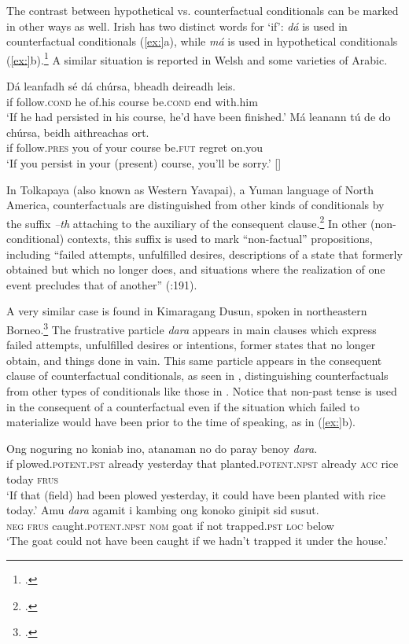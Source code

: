 The contrast between hypothetical vs. counterfactual conditionals can be marked in other ways as well. Irish has two distinct words for ‘if’: \textit{dá} is used in counterfactual conditionals (\ref{ex:}a), while \textit{má} is used in hypothetical conditionals (\ref{ex:}b).\footnote{\citet{McCloskey2001}.} A similar situation is reported in Welsh and some varieties of Arabic.


\ea
\ea  \gll Dá  leanfadh  sé  dá  chúrsa,  bheadh  deireadh  leis.\\
if  follow.\textsc{cond}  he  of.his  course  be.\textsc{cond}  end  with.him\\
\glt ‘If he had persisted in his course, he’d have been finished.’
\ex \gll  Má  leanann  tú  de  do  chúrsa,  beidh  aithreachas  ort.\\
if  follow.\textsc{pres}  you  of  your  course  be.\textsc{fut}  regret  on.you\\
\glt ‘If you persist in your (present) course, you’ll be sorry.’  [\citealt{McCloskey2001}]
\z \z


In Tolkapaya (also known as Western Yavapai), a Yuman language of North America, counterfactuals are distinguished from other kinds of conditionals by the suffix \textit{–th} attaching to the auxiliary of the consequent clause.\footnote{\citet{HardyGordon1980}.} In other (non-conditional) contexts, this suffix is used to mark “non-factual” propositions, including “failed attempts, unfulfilled desires, descriptions of a state that formerly obtained but which no longer does, and situations where the realization of one event precludes that of another” (\citealt{HardyGordon1980}:191).



A very similar case is found in Kimaragang Dusun, spoken in northeastern Borneo.\footnote{\citet{Kroeger2017}.} The frustrative particle \textit{dara} appears in main clauses which express failed attempts, unfulfilled desires or intentions, former states that no longer obtain, and things done in vain. This same particle appears in the consequent clause of counterfactual conditionals, as seen in , distinguishing counterfactuals from other types of conditionals like those in . Notice that non-past tense is used in the consequent of a counterfactual even if the situation which failed to materialize would have been prior to the time of speaking, as in (\ref{ex:}b).


\ea
\ea \gll  Ong  noguring  no  koniab  ino,  atanaman  no   do  paray  benoy  \textit{dara}.\\
if  plowed.\textsc{potent.pst}  already  yesterday  that  planted.\textsc{potent.npst}  already \textsc{acc}  rice  today  \textsc{frus}\\
\glt ‘If that (field) had been plowed yesterday, it could have been planted with rice today.’
\ex \gll  Amu  \textit{dara}  agamit  i  kambing  ong  konoko  ginipit  sid  susut.\\
\textsc{neg}  \textsc{frus}  caught.\textsc{potent.npst}  \textsc{nom}  goat  if  not  trapped\textsc{.pst  loc}  below\\
\glt ‘The goat could not have been caught if we hadn’t trapped it under the house.’
\z \z

